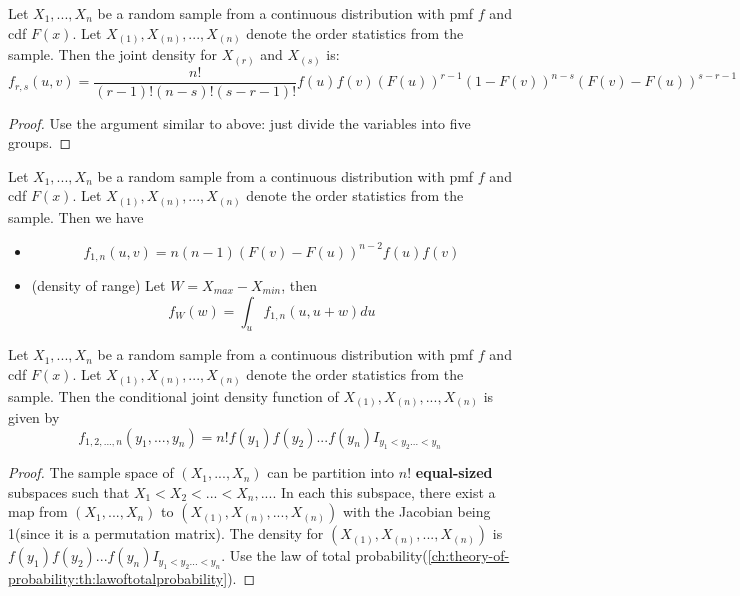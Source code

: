 \begin{refsection}
\begin{lemma}
	Let $X_1,...,X_n$ be a random sample from a continuous distribution with pmf $f$ and cdf $F(x)$. 
	Let $X_{(1)},X_{(n)},...,X_{(n)}$ denote the order statistics from the sample. Then the joint density for $X_{(r)}$ and $X_{(s)}$ is:
	$$f_{r,s} (u,v) = \frac{n!}{(r-1)!(n-s)!(s-r-1)!} f(u)f(v)(F(u))^{r-1}(1-F(v))^{n-s}(F(v)-F(u))^{s-r-1}$$
\end{lemma}
\begin{proof}
Use the argument similar to above: just divide the variables into five groups.
\end{proof}

\begin{corollary}
Let $X_1,...,X_n$ be a random sample from a continuous distribution with pmf $f$ and cdf $F(x)$. 
Let $X_{(1)},X_{(n)},...,X_{(n)}$ denote the order statistics from the sample.
Then we have
\begin{itemize}
	\item $$f_{1,n}(u,v) = n(n-1) (F(v)-F(u))^{n-2}f(u)f(v)$$
	\item (density of range) Let $W = X_{max} - X_{min}$, then
	$$f_W(w) = \int_u f_{1,n}(u,u+w) du$$
\end{itemize}
	
\end{corollary}

 
\begin{lemma}
Let $X_1,...,X_n$ be a random sample from a continuous distribution with pmf $f$ and cdf $F(x)$. 
Let $X_{(1)},X_{(n)},...,X_{(n)}$ denote the order statistics from the sample. Then the conditional joint density function of $X_{(1)},X_{(n)},...,X_{(n)}$ is given by
$$f_{1,2,...,n}(y_1,...,y_n) = n!f(y_1)f(y_2)...f(y_n)I_{y_1<y_2...<y_n}$$
\end{lemma}
\begin{proof}
The sample space of $(X_1,...,X_n)$ can be partition into $n!$ \textbf{equal-sized} subspaces such that $X_1<X_2<...<X_n,...$. In each this subspace, there exist a map from $(X_1,...,X_n)$ to $(X_{(1)},X_{(n)},...,X_{(n)})$ with the Jacobian being 1(since it is a permutation matrix). The density for $(X_{(1)},X_{(n)},...,X_{(n)})$ is $f(y_1)f(y_2)...f(y_n)I_{y_1<y_2...<y_n}$. Use the law of total probability(\autoref{ch:theory-of-probability:th:lawoftotalprobability}).
\end{proof}







\end{refsection}
